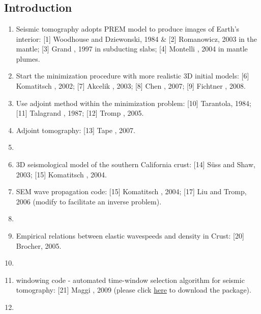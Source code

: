 \renewcommand{\pmk}{Tape\_2009\_S\_Adjoint at SCC}
\renewcommand{\prf}{FWI/\pmk.pdf}
\renewcommand{\pti}{Adjoint tomography of the southern California crust}
\renewcommand{\pay}{Carl Tape, Qinya Liu, and Alessia Maggi \etal, 2009}
\renewcommand{\pjo}{Science}
\renewcommand{\pda}{2016/11/27 Sun.}

\section{\pinfo}
\subsection{Introduction}
\begin{enumerate}[\hspace{10mm}*]
  \item Seismic tomography adopts PREM model to produce images of Earth's interior:
    [1] Woodhouse and Dziewonski, 1984 \& [2] Romanowicz, 2003 in the mantle;
    [3] Grand \etal, 1997 in subducting slabs; [4] Montelli \etal, 2004 in mantle plumes.
  \item Start the minimization procedure with more realistic 3D initial models:
    [6] Komatitsch \etal, 2002; [7] Akcelik \etal, 2003;
    [8] Chen \etal, 2007; [9] Fichtner \etal, 2008.
  \item Use adjoint method within the minimization problem:
    [10] Tarantola, 1984; [11] Talagrand \etal, 1987; [12] Tromp \etal, 2005.
  \item Adjoint tomography: [13] Tape \etal, 2007.
  \item \sline
  \item 3D seismological model of the southern California crust:
    [14] S\"{u}ss and Shaw, 2003; [15] Komatitsch \etal, 2004.
  \item SEM wave propagation code: [15] Komatitsch \etal, 2004;
    [17] Liu and Tromp, 2006 (modify to facilitate an inverse problem).
  \item \sline
  \item Empirical relations between elastic wavespeeds and density in Crust: [20] Brocher, 2005.
  \item \sline
  \item {} windowing code
    - automated time-window selection algorithm for seismic tomography: [21] Maggi \etal, 2009
    (please click \href{http://geodynamics.org/cig/software/flexwin/}{here}
    to download the package).
  \item \sline

\end{enumerate}
